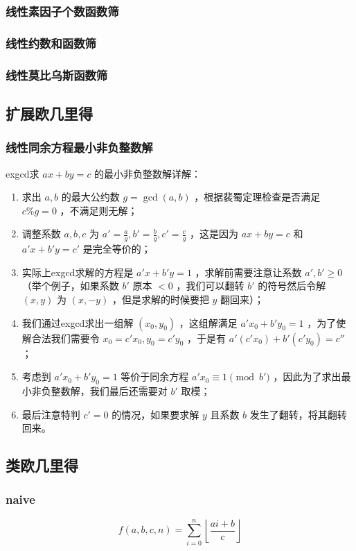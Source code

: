 \documentclass{article}
\begin{document}
\subsubsection{线性素因子个数函数筛}

\subsubsection{线性约数和函数筛}

\subsubsection{线性莫比乌斯函数筛}

\subsection{扩展欧几里得}
\subsubsection{线性同余方程最小非负整数解}
exgcd求 $ax+by=c$ 的最小非负整数解详解：
\begin{enumerate}
    \item 求出 $a,b$ 的最大公约数 $g=\gcd(a,b)$ ，根据裴蜀定理检查是否满足 $c\% g=0$ ，不满足则无解；
    \item 调整系数 $a,b,c$ 为 $a'=\frac{a}{g},b'=\frac{b}{g},c'=\frac{c}{g}$ ，这是因为 $ax+by=c$ 和 $a'x+b'y=c'$ 是完全等价的；
    \item 实际上exgcd求解的方程是 $a'x+b'y=1$ ，求解前需要注意让系数 $a',b'\geq 0$ （举个例子，如果系数 $b'$ 原本 $<0$ ，我们可以翻转 $b'$ 的符号然后令解 $(x,y)$ 为 $(x,-y)$ ，但是求解的时候要把 $y$ 翻回来）；
    \item 我们通过exgcd求出一组解 $(x_0,y_0)$ ，这组解满足 $a'x_0+b'y_0=1$ ，为了使解合法我们需要令 $x_0=c'x_0,y_0=c'y_0$ ，于是有 $a'(c'x_0)+b'(c'y_0)=c''$ ；
    \item 考虑到 $a'x_0+b'y_0=1$ 等价于同余方程 $a'x_0\equiv 1\pmod{b'}$ ，因此为了求出最小非负整数解，我们最后还需要对 $b'$ 取模；
    \item 最后注意特判 $c'=0$ 的情况，如果要求解 $y$ 且系数 $b$ 发生了翻转，将其翻转回来。
\end{enumerate}

\subsection{类欧几里得}
\subsubsection{naive}
$$
f(a,b,c,n)=\sum_{i=0}^n\left\lfloor \frac{ai+b}{c} \right\rfloor
$$
\end{document}
